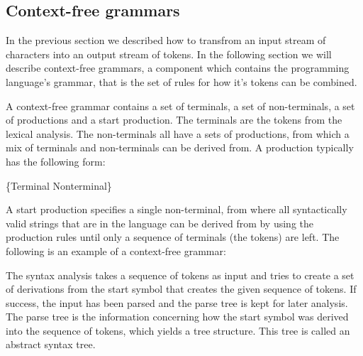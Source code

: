 \subsection{Context-free grammars}
\label{sec:context-freegrammars}
In the previous section we described how to transfrom an input stream of characters into an output stream of tokens. In the following section we
will describe context-free grammars, a component which contains the programming language’s grammar, that is the set of rules for how it’s tokens can be combined.

A context-free grammar contains a set of terminals, a set of non-terminals, a set of productions and a start production. The terminals are the tokens from the lexical analysis. The non-terminals all have a sets of productions, from which a mix of terminals and non-terminals can be derived from. A production typically has the following form:

\begin{ebnf}
 {\{Terminal \gor \gcat Nonterminal\}}
\end{ebnf}

A start production specifies a single non-terminal, from where all syntactically valid strings that are in the language can be derived from by using the production rules until only a sequence of terminals (the tokens) are left. The following is an example of a context-free grammar: 

\begin{ebnf}
\galt{\gter{>}}
\galt{\gter{<}}
\end{ebnf}

The syntax analysis takes a sequence of tokens as input and tries to create a set of derivations from the start symbol that creates the given sequence of tokens. If success, the input has been parsed and the parse tree is kept for later analysis. The parse tree is the information concerning how the start symbol was derived into the sequence of tokens, which yields a tree structure. This tree is called an abstract syntax tree.

